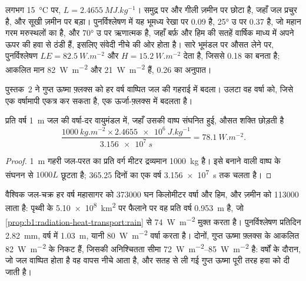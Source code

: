 लगभग \qty{15}{\celsius} पर, $L = \qty{2.4655}{MJ.kg^{-1}}$।  समुद्र पर और गीली ज़मीन पर छोटा है, जहाँ जल प्रचुर है, और सूखी ज़मीन पर बड़ा।
पुनर्विश्लेषण में यह भूमध्य रेखा पर \num{0.09} है, \ang{25} उ पर \num{0.37} है, जो महान गरम मरुस्थलों का  है, और \ang{70} उ पर ऋणात्मक है, जहाँ बर्फ़ और हिम की सतहें वार्षिक माध्य में अपने ऊपर की हवा से ठंडी हैं, इसलिए संवेदी  नीचे की ओर होता है।
सारे भूमंडल पर औसत लेने पर, पुनर्विश्लेषण $LE =
\qty{82.5}{W.m^{-2}}$ और $H = \qty{15.2}{W.m^{-2}}$ देता है, जिससे \num{0.18} का  बनता है;
आकलित मान \qty{82}{W.m^{-2}} और \qty{21}{W.m^{-2}} हैं, \num{0.26} का अनुपात।

पुस्तक~2 ने गुप्त ऊष्मा फ़्लक्स को हर वर्ष वाष्पित जल की गहराई में बदला। उलटा वह वर्षा को, जिसे एक वर्षामापी एकत्र कर सकता है, एक ऊर्जा-फ़्लक्स में बदलता है।

\begin{proposition}[वर्षा एक ऊर्जा-फ़्लक्स के रूप में]\label{prop:b1:radiation-heat-transport:rain}
प्रति वर्ष \qty{1}{m} जल की वर्षा-दर वायुमंडल में, जहाँ उसकी वाष्प संघनित हुई, औसत शक्ति छोड़ती है
\[
  \frac{\qty{1000}{kg.m^{-2}} \times \qty{2.4655e6}{J.kg^{-1}}}{\qty{3.156e7}{s}}
  = \qty{78.1}{W.m^{-2}} .
\]
\end{proposition}

\begin{proof}
\qty{1}{m} गहरी जल-परत का प्रति वर्ग मीटर द्रव्यमान \qty{1000}{kg} है।
इसे बनाने वाली वाष्प के संघनन से $1000L$ छूटता है; \num{365.25} दिनों का एक वर्ष \qty{3.156e7}{s} तक चलता है।
\end{proof}

\begin{example}[जल-चक्र एक ऊर्जा-फ़्लक्स के रूप में]\label{ex:b1:radiation-heat-transport:rain}
वैश्विक जल-चक्र हर वर्ष महासागर को \num{373000} घन किलोमीटर वर्षा और हिम, और ज़मीन को \num{113000} लाता है: पृथ्वी के \qty{5.10e8}{km^2} पर फैलाने पर वह प्रति वर्ष \qty{0.953}{m} है, जो \cref{prop:b1:radiation-heat-transport:rain} से \qty{74}{W.m^{-2}} मुक्त करता है। पुनर्विश्लेषण प्रतिदिन \qty{2.82}{mm}, वर्ष में \qty{1.03}{m}, यानी \qty{80}{W.m^{-2}} वर्षा करता है। दोनों, गुप्त ऊष्मा फ़्लक्स के आकलित \qty{82}{W.m^{-2}} के निकट हैं, जिसकी अनिश्चितता सीमा \qtyrange{72}{85}{W.m^{-2}} है: वर्षों के दौरान, जो जल वाष्पित होता है वह वापस नीचे आता है, और सतह से ली गई गुप्त ऊष्मा पूरी तरह हवा को दी जाती है।
\end{example}

